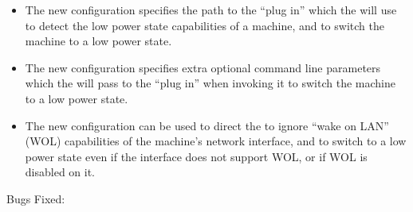 \begin{itemize}
\item The new configuration  specifies the
  path to the ``plug in'' which the  will use to detect
  the low power state capabilities of a machine, and to switch the
  machine to a low power state.

\item The new configuration 
  specifies extra optional command line parameters which the
   will pass to the ``plug in'' when invoking it to
  switch the machine to a low power state.

\item The new configuration  can be
  used to direct the  to ignore ``wake on LAN'' (WOL)
  capabilities of the machine's network interface, and to switch to a
  low power state even if the interface does not support WOL, or if
  WOL is disabled on it.

\end{itemize}

\noindent Bugs Fixed:

